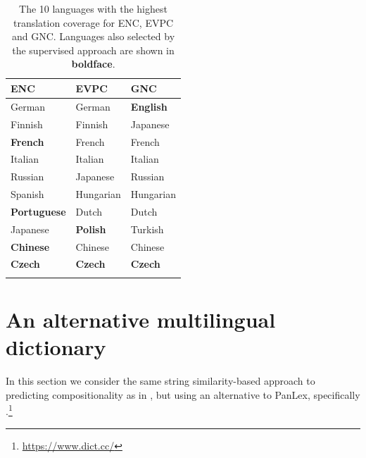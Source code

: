 \documentclass[output=paper
,modfonts
,nonflat]{langsci/langscibook}
\begin{document}
\begin{table}[t]
\begin{center}
\begin{tabular}{l l l } \lsptoprule

ENC&EVPC&GNC\\
\midrule
German & German & \textbf{English}\\
Finnish  & Finnish & Japanese\\
\textbf{French}& French & French\\
Italian& Italian & Italian\\
Russian&  Japanese & Russian\\
Spanish & Hungarian & Hungarian\\
\textbf{Portuguese} & Dutch & Dutch\\
Japanese& \textbf{Polish}&  Turkish\\
\textbf{Chinese} & Chinese & Chinese\\
\textbf{Czech}&  \textbf{Czech} &\textbf{Czech}\\
\lspbottomrule

\end{tabular}

\end{center}
\caption{\label{tab:ss:cov} The 10 languages with the highest
  translation coverage for ENC, EVPC and GNC. Languages also selected
  by the supervised approach are shown in \textbf{boldface}.}
\end{table}




\section{An alternative multilingual dictionary\label{sec:dictcc}}

In this section we consider the same string similarity-based approach
to predicting compositionality as in , but
using an alternative  to PanLex, specifically
\dictcc.\footnote{\url{https://www.dict.cc/}}

\end{document}
